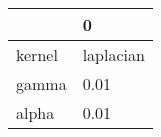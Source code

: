 \begin{tabular}{ll}
\toprule
{} &          0 \\
\midrule
kernel &  laplacian \\
gamma  &       0.01 \\
alpha  &       0.01 \\
\bottomrule
\end{tabular}

